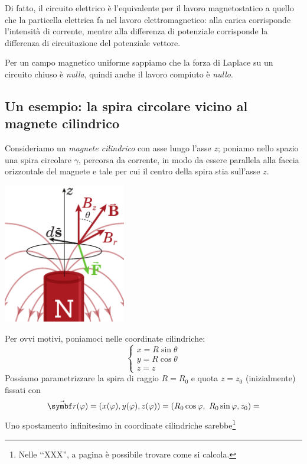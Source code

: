 Di fatto, il circuito elettrico è l'equivalente per il lavoro magnetostatico a quello che la particella elettrica fa nel lavoro elettromagnetico: alla carica corrisponde l'intensità di corrente, mentre alla differenza di potenziale corrisponde la differenza di circuitazione del potenziale vettore.

Per un campo magnetico uniforme sappiamo che la forza di Laplace su un circuito chiuso è \textit{nulla}, quindi anche il lavoro compiuto è \textit{nullo}.
\subsection{Un esempio: la spira circolare vicino al magnete cilindrico}
Consideriamo un \textit{magnete cilindrico} con asse lungo l'asse $z$; poniamo nello spazio una spira circolare $\gamma$, percorsa da corrente, in modo da essere parallela alla faccia orizzontale del magnete e tale per cui il centro della spira stia sull'asse $z$.
\begin{center}
	\includegraphics[width=0.4\textwidth]{images/chp8/chp8magnetecilindrico1.pdf}
\end{center}
Per ovvi motivi, poniamoci nelle coordinate cilindriche:
\begin{equation*}
	\begin{cases}
		x=R\sin\theta\\
		y=R\cos\theta\\
		z=z
	\end{cases}
\end{equation*}
Possiamo parametrizzare la spira di raggio $R=R_0$ e quota $z=z_0$ (inizialmente) fissati con
\begin{equation*}
	\vba{r}(\phi)=\left(x(\phi),y(\phi),z(\phi)\right)=\left(R_0\cos\phi,\ R_0\sin\phi, z_0\right)=
\end{equation*}
Uno spostamento infinitesimo in coordinate cilindriche sarebbe\footnote{	Nelle ‘‘XXX'', a pagina \pageref{spinfinitesimocilindriche} è possibile trovare come si calcola.}
